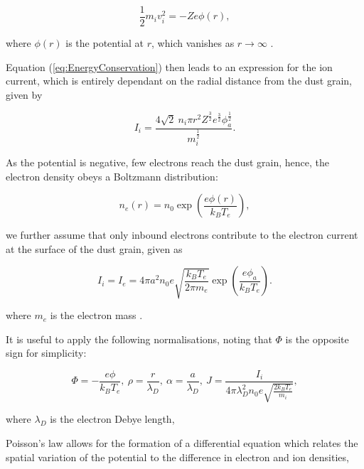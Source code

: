 \documentclass{article}
\begin{document}
\begin{equation}\label{eq:EnergyConservation}
\frac{1}{2} m_i v_i^2 = -Ze\phi(r),
\end{equation}

\noindent where $\phi(r)$ is the potential at $r$, which vanishes as $r \to \infty$ \cite{ABR}.

\medskip

Equation (\ref{eq:EnergyConservation}) then leads to an expression for the ion current, which is entirely dependant on the radial distance from the 
dust grain, given by

\begin{equation}\label{eq:ABRIi}
I_i = \frac{4\sqrt{2} \ n_i \pi r^2 Z^{\frac{3}{2}}e^{\frac{3}{2}} \phi_a^{\frac{1}{2}} } {m_i^{\frac{1}{2}}}.
\end{equation}

As the potential is negative, few electrons reach the dust grain, hence, the electron density obeys a Boltzmann
distribution:

\begin{equation}\label{eq:ABRed}
n_e(r) = n_0 \exp{\left(\frac{e\phi(r)}{k_B T_e}\right)},
\end{equation}

\smallskip

we further assume that only inbound electrons contribute to the electron current at the surface of the dust
grain, given as

\begin{equation}\label{eq:ABRIe}
I_i = I_e = 4 \pi a^2 n_0 e \sqrt{\frac{k_B T_e}{2 \pi m_e }} \exp{\left(\frac{e \phi_a}{k_B T_e}\right)}.
\end{equation}  

\noindent where $m_e$ is the electron mass \cite{ABR}.

\medskip

It is useful to apply the following normalisations, noting that $\Phi$ is the opposite
sign for simplicity:

\begin{equation}\label{eq:ABRnorm}
{\Phi = - \frac{e\phi}{k_B T_e}}, \ {\rho = \frac{r}{\lambda_D}},\ {\alpha = \frac{a}{\lambda_D}},\ {J = \frac{I_i}{4 \pi \lambda_D^2 n_0 e \sqrt{\frac{2k_B T_e}{m_i}}}},
\end{equation}
    
\noindent where $\lambda_D$ is the electron Debye length, 

\medskip

Poisson's law allows for the formation of a differential equation which relates
the spatial variation of the potential to the difference in electron and 
ion densities,
\end{document}
